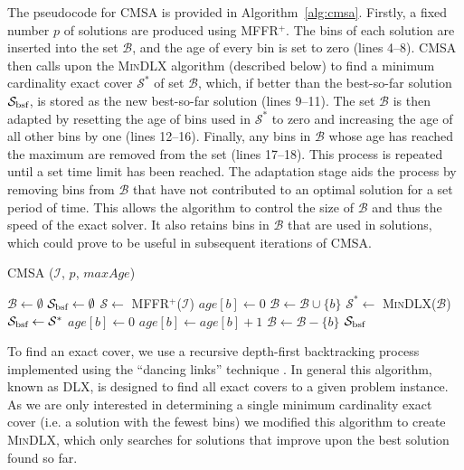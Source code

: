 \documentclass{IEEEtran}
\begin{document}
The pseudocode for CMSA is provided in Algorithm~\ref{alg:cmsa}. Firstly, a fixed number $p$ of solutions are produced using MFFR$^+$. The bins of each solution are inserted into the set $\mathcal{B}$, and the age of every bin is set to zero (lines 4--8). CMSA then calls upon the \textsc{MinDLX} algorithm (described below) to find a minimum cardinality exact cover $\mathcal{S}^*$ of set $\mathcal{B}$, which, if better than the best-so-far solution $\mathcal{S}_{\textup{bsf}}$, is stored as the new best-so-far solution (lines 9--11). The set $\mathcal{B}$ is then adapted by resetting the age of bins used in $\mathcal{S}^*$ to zero and increasing the age of all other bins by one (lines 12--16). Finally, any bins in $\mathcal{B}$ whose age has reached the maximum are removed from the set (lines 17--18). This process is repeated until a set time limit has been reached. The adaptation stage aids the process by removing bins from $\mathcal{B}$ that have not contributed to an optimal solution for a set period of time. This allows the algorithm to control the size of $\mathcal{B}$ and thus the speed of the exact solver. It also retains bins in $\mathcal{B}$ that are used in solutions, which could prove to be useful in subsequent iterations of CMSA.

\begin{algorithm}[H]
\caption{CMSA ($\mathcal{I}$, $p$, $maxAge$)}
\begin{algorithmic}[1]
	\State $\mathcal{B} \gets \emptyset$
	\State $\mathcal{S}_{\textup{bsf}} \gets \emptyset$
			\State $\mathcal{S} \gets$ MFFR$^+$($\mathcal{I}$)
				\State $age[b] \gets 0$
				\State $\mathcal{B} \gets \mathcal{B} \cup \{b\}$
			\EndFor
		\EndFor
		\State $\mathcal{S}^* \gets$ \textsc{MinDLX}($\mathcal{B}$)
			\State $\mathcal{S}_{\textup{bsf}} \gets \mathcal{S}^*$
		\EndIf
				\State $age[b] \gets 0$
				\State $age[b] \gets age[b] + 1$
					\State $\mathcal{B} \gets \mathcal{B} - \{b\}$
				\EndIf
			\EndIf		
		\EndFor
	\EndWhile
	\Return $\mathcal{S}_{\textup{bsf}}$
\end{algorithmic}
\label{alg:cmsa}	
\end{algorithm}	

\noindent To find an exact cover, we use a recursive depth-first backtracking process implemented using the ``dancing links'' technique \cite{knuth2000}. In general this algorithm, known as DLX, is designed to find all exact covers to a given problem instance. As we are only interested in determining a single minimum cardinality exact cover (i.e. a solution with the fewest bins) we modified this algorithm to create \textsc{MinDLX}, which only searches for solutions that improve upon the best solution found so far.
\end{document}
